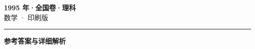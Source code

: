 \documentclass[zihao=5, a4paper]{ctexart}
\begin{document}
\begin{center}
  {\Large\bfseries 1995 年·全国卷·理科}\\[4pt]
  {\large 数学 · 印刷版}
\end{center}
\medskip
{}

\par\bigskip\hrule\bigskip
{}
\begin{center}{\large\bfseries 参考答案与详细解析}\end{center}
\smallskip

\end{document}
